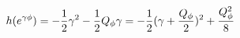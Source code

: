 \begin{equation}
h(e^{\gamma\phi})=-{1\over 2}\gamma^2-{1\over 2}Q_{\phi}\gamma=-{1\over 2}(\gamma+{Q_{\phi}\over 2})^2+{Q_{\phi}^2\over 8}
\end{equation}

